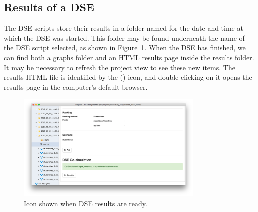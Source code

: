 \subsection{Results of a DSE}\label{sec:dse:results}
The DSE scripts store their results in a folder named for the date and time at which the DSE was started.
%
This folder may be found underneath the name of the DSE script selected, as shown in Figure~\ref{fig:dse:results:icon}.  When the DSE has finished, we can find both a graphs folder and an HTML results page inside the results folder.
%
It may be necessary to refresh the project view to see these new items.  The results HTML file is identified by the (\ResultsIcon) icon, and double clicking on it opens the results page in the computer's default browser.
%
%
%
\begin{figure}[ht]
	\centering
	\includegraphics[width=0.8\textwidth]{figures/dse/results-icon}
	\caption{Icon shown when DSE results are ready.}\label{fig:dse:results:icon}
\end{figure}
%
%
%

